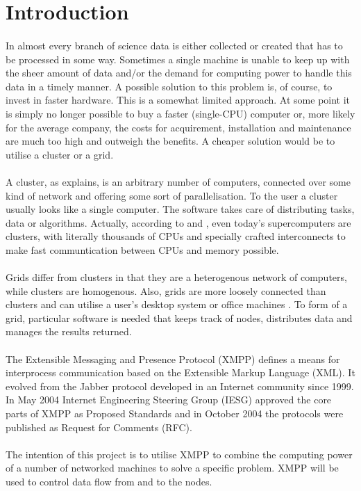\section{Introduction}
\paragraph{}
In almost every branch of science data is either collected or created that has to be processed in some way. Sometimes a single machine is unable to keep up with the sheer amount of data and/or the demand for computing power to handle this data in a timely manner. A possible solution to this problem is, of course, to invest in faster hardware. This is a somewhat limited approach. At some point it is simply no longer possible to buy a faster (single-CPU) computer or, more likely for the average company, the costs for acquirement, installation and maintenance are much too high and outweigh the benefits. A cheaper solution would be to utilise a cluster or a grid.
\paragraph{}
A cluster, as  explains, is an arbitrary number of computers, connected over some kind of network and offering some sort of parallelisation. To the user a cluster usually looks like a single computer. The software takes care of distributing tasks, data or algorithms. Actually, according to  and , even today's supercomputers are clusters, with literally thousands of CPUs and specially crafted interconnects to make fast communtication between CPUs and memory possible.
\paragraph{}
Grids differ from clusters in that they are a heterogenous network of computers, while clusters are homogenous. Also, grids are more loosely connected than clusters and can utilise a user's desktop system or office machines \cite{wikipedia005}. To form of a grid, particular software is needed that keeps track of nodes, distributes data and manages the results returned.
\paragraph{}
The Extensible Messaging and Presence Protocol (XMPP) defines a means for interprocess communication based on the Extensible Markup Language (XML). It evolved from the Jabber protocol developed in an Internet community since 1999. In May 2004 Internet Engineering Steering Group (IESG) approved the core parts of XMPP \cite{xmpp-core,xmpp-im} as Proposed Standards and in October 2004 the protocols were published as Request for Comments (RFC).
\paragraph{}
The intention of this project is to utilise XMPP to combine the computing power of a number of networked machines to solve a specific problem. XMPP will be used to control data flow from and to the nodes.
